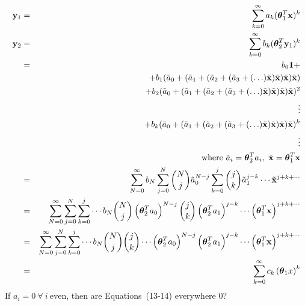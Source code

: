 \begin{eqnarray}
	{\bold y}_1 & = & \sum_{k=0}^\infty a_k (\boldsymbol\theta_1^T {\bold x})^k \nonumber \\
	{\bold y}_2 & = & \sum_{k=0}^\infty b_k (\boldsymbol\theta_2^T {\bold y}_1)^k \nonumber \\
		& = & b_0 {\bold 1} + \nonumber\\
		&   & + b_1 (\tilde a_0 +%
					(\tilde a_1 + %
						(\tilde a_2 + %
							(\tilde a_3 + %
								(\ldots) \tilde {\bold x} )%
							\tilde {\bold x} )%
						\tilde {\bold x} )%
					\tilde {\bold x}) \nonumber \\
		&   & + b_2 (\tilde a_0 +%
					(\tilde a_1 + %
						(\tilde a_2 + %
							(\tilde a_3 + %
								(\ldots) \tilde {\bold x} )%
							\tilde {\bold x} )%
						\tilde {\bold x} )%
					\tilde {\bold x})^2 \nonumber \\
		&   & \vdots \nonumber \\
		&   & + b_k (\tilde a_0 +%
					(\tilde a_1 + %
						(\tilde a_2 + %
							(\tilde a_3 + %
								(\ldots) \tilde {\bold x} )%
							\tilde {\bold x} )%
						\tilde {\bold x} )%
					\tilde {\bold x})^k \nonumber \\
		&   & \vdots \nonumber \\
		&   & \text{where}\ \tilde a_i = \boldsymbol\theta_2^T a_i, %
					\ \tilde{\bold x} = \boldsymbol\theta_1^T {\bold x} \nonumber \\
		& = & \sum_{N=0}^\infty %
				b_N %
				\sum_{j=0}^N \binom{N}{j} \tilde a_0^{N-j} %
				\sum_{k=0}^j \binom{j}{k} \tilde a_1^{j-k} %
				\cdots %
				\tilde{\bold x}^{j+k+\cdots} \\
		& = & \sum_{N=0}^\infty %
				\sum_{j=0}^N %
				\sum_{k=0}^j %
				\cdots %
					b_N %
					\binom{N}{j} \left( \boldsymbol\theta_2^T a_0 \right)^{N-j} %
					\binom{j}{k} \left( \boldsymbol\theta_2^T a_1 \right)^{j-k} %
					\cdots %
					\left(\boldsymbol\theta_1^T {\bold x}\right)^{j+k+\cdots} \nonumber \\
		& = & \sum_{N=0}^\infty %
				\sum_{j=0}^N %
				\sum_{k=0}^j %
				\cdots %
					b_N %
					\binom{N}{j} %
					\binom{j}{k} %
					\cdots %
					\left( \boldsymbol\theta_2^T a_0 \right)^{N-j} %
					\left( \boldsymbol\theta_2^T a_1 \right)^{j-k} %
					\cdots %
					\left(\boldsymbol\theta_1^T {\bold x}\right)^{j+k+\cdots} \nonumber \\
		& = & \sum_{k=0}^\infty c_k \left( \boldsymbol\theta_1 x \right)^k
\end{eqnarray}
{\color{red} If $a_i = 0\ \forall\ i\ \text{even}$, then are Equations~(13-14) everywhere 0?}

